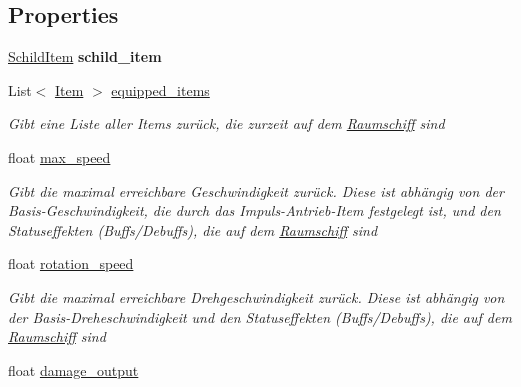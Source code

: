 \subsection*{Properties}
\begin{DoxyCompactItemize}
\item 
\mbox{\label{class_spaceship_ae00fee3dd4ed5e2dc8c8c5f96505a5a3}} 
\hyperlink{class_schild_item}{Schild\+Item} {\bfseries schild\+\_\+item}
\item 
List$<$ \hyperlink{class_item}{Item} $>$ \hyperlink{class_spaceship_a89158e2a2dc71a98acb3c3755962c144}{equipped\+\_\+items}
\begin{DoxyCompactList}\small\item\em Gibt eine Liste aller Items zurück, die zurzeit auf dem \hyperlink{class_raumschiff}{Raumschiff} sind \end{DoxyCompactList}\item 
float \hyperlink{class_spaceship_a9dfc7adf86ae18216d0244326e7a6ebf}{max\+\_\+speed}
\begin{DoxyCompactList}\small\item\em Gibt die maximal erreichbare Geschwindigkeit zurück. Diese ist abhängig von der Basis-\/\+Geschwindigkeit, die durch das Impuls-\/\+Antrieb-\/\+Item festgelegt ist, und den Statuseffekten (Buffs/\+Debuffs), die auf dem \hyperlink{class_raumschiff}{Raumschiff} sind \end{DoxyCompactList}\item 
float \hyperlink{class_spaceship_a9dede788e870c34a09db8d22e9ac61f6}{rotation\+\_\+speed}
\begin{DoxyCompactList}\small\item\em Gibt die maximal erreichbare Drehgeschwindigkeit zurück. Diese ist abhängig von der Basis-\/\+Dreheschwindigkeit und den Statuseffekten (Buffs/\+Debuffs), die auf dem \hyperlink{class_raumschiff}{Raumschiff} sind \end{DoxyCompactList}\item 
float \hyperlink{class_spaceship_ad98db7a91256b60c912c508cff2f001d}{damage\+\_\+output}

\end{DoxyCompactItemize}
